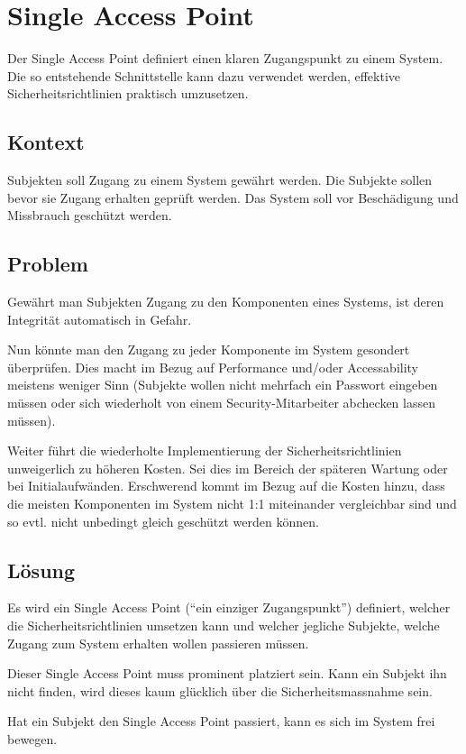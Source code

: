 \section{Single Access Point}
Der Single Access Point definiert einen klaren Zugangspunkt zu einem System. Die so entstehende Schnittstelle kann dazu verwendet werden, effektive Sicherheitsrichtlinien praktisch umzusetzen.

\subsection*{Kontext}
Subjekten soll Zugang zu einem System gewährt werden. Die Subjekte sollen bevor sie Zugang erhalten geprüft werden. Das System soll vor Beschädigung und Missbrauch geschützt werden.

\subsection*{Problem}
Gewährt man Subjekten Zugang zu den Komponenten eines Systems, ist deren Integrität automatisch in Gefahr.

Nun könnte man den Zugang zu jeder Komponente im System gesondert überprüfen. Dies macht im Bezug auf Performance und/oder Accessability meistens weniger Sinn (Subjekte wollen nicht mehrfach ein Passwort eingeben müssen oder sich wiederholt von einem Security-Mitarbeiter abchecken lassen müssen).

Weiter führt die wiederholte Implementierung der Sicherheitsrichtlinien unweigerlich zu höheren Kosten. Sei dies im Bereich der späteren Wartung oder bei Initialaufwänden. Erschwerend kommt im Bezug auf die Kosten hinzu, dass die meisten Komponenten im System nicht 1:1 miteinander vergleichbar sind und so evtl. nicht unbedingt gleich geschützt werden können.


\subsection*{Lösung}
Es wird ein Single Access Point (``ein einziger Zugangspunkt'') definiert, welcher die Sicherheitsrichtlinien umsetzen kann und welcher jegliche Subjekte, welche Zugang zum System erhalten wollen passieren müssen.

Dieser Single Access Point muss prominent platziert sein. Kann ein Subjekt ihn nicht finden, wird dieses kaum glücklich über die Sicherheitsmassnahme sein. 

Hat ein Subjekt den Single Access Point passiert, kann es sich im System frei bewegen.

